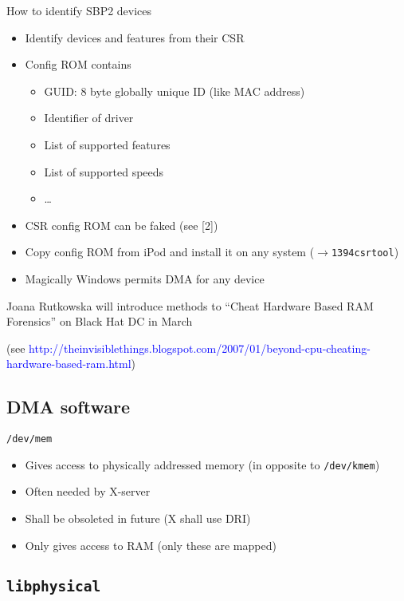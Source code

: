 \documentclass{beamer}
\newenvironment{itemizeframe}[1]
  {\begin{frame}{#1}\startitemizeframe}
  {\stopitemizeframe\end{frame}}
\newcommand\startitemizeframe{\begin{itemize}}
\newcommand\stopitemizeframe{\end{itemize}}
\begin{document}
		\begin{itemizeframe}{How to identify SBP2 devices}
			\item Identify devices and features from their CSR 
			\item Config ROM contains
			\begin{itemize}
				\item GUID: 8 byte globally unique ID (like MAC address)
				\item Identifier of driver
				\item List of supported features
				\item List of supported speeds
				\item \ldots
			\end{itemize}
			\item<2-> CSR config ROM can be faked (see [2])
			\item<3-> Copy config ROM from iPod and install it on any system ($\rightarrow$\texttt{1394csrtool})
			\item<4-> Magically Windows permits DMA for \alert{any} device
		\end{itemizeframe}

		\begin{frame}
			Joana Rutkowska will introduce methods to ``Cheat Hardware Based RAM Forensics'' on Black Hat DC in March

			(see \textcolor{blue}{http://theinvisiblethings.blogspot.com/2007/01/beyond-cpu-cheating-hardware-based-ram.html})
		\end{frame}
		
	\subsection{DMA software}

		\begin{itemizeframe}{\texttt{/dev/mem}}
			\item Gives access to physically addressed memory (in opposite to \texttt{/dev/kmem})
			\item Often needed by X-server
			\item Shall be obsoleted in future (X shall use DRI)
			\item Only gives access to  RAM (only these are mapped)
		\end{itemizeframe}

	\subsection{\texttt{libphysical}}
\end{document}
